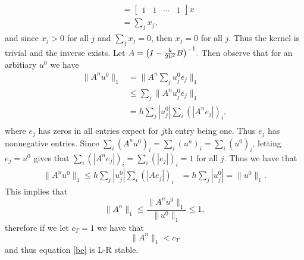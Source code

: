 \documentclass[12pt]{report}
\begin{document}
\begin{solution}
\begin{align*}
      &= \begin{bmatrix} 1 & 1 & \cdots & 1 \end{bmatrix} x\\
      &= \sum_j x_j,
    \end{align*}
    and since $x_j > 0$ for all $j$ and $\sum_j x_j = 0$, then $x_j = 0$ for all $j$. Thus the kernel is trivial and the inverse exists. Let $A = {\left(I - \frac{k}{2h^2}B\right)}^{-1}.$ Then observe that for an arbitiary $u^0$ we have 
    \begin{align*}
      \| A^n u^0 \|_1 &= \|A^n \sum_j u_j^0 e_j\|_1\\
        &\leq \sum_j \| A^n u_j^0 e_j \|_1\\
        &= h \sum_j|u^0_j|\sum_i(|A^n e_j|)_i,\\
    \end{align*} 
    where $e_j$ has zeros in all entries expect for $j$th entry being one. Thus $e_j$ has nonnegative entries. Since $\sum_i(A^n u^0)_i = \sum_i(u^n)_i = \sum_i (u^0)_i$, letting $e_j = u^0$ gives that $\sum_i(|A^n e_j|)_i = \sum_i(|e_j|)_i = 1$ for all $j$. Thus we have that
    \begin{align*}
      \| A^n u^0 \|_1 \leq h \sum_j|u^0_j|\sum_i(|Ae_j|)_i &= h \sum_j|u^0_j| = \| u^0 \|_1.
    \end{align*}
    This implies that
    \[ 
    \| A^n \|_1 \leq \frac{\| A^n u^0 \|_1}{\| u^0 \|_1} \leq 1,  
    \]
    therefore if we let $c_T = 1$ we have that
    \[ 
      \|A^n\|_1 < c_T
    \]
    and thus equation \ref{be} is L-R stable.


\end{solution}

\newpage


\end{document}
